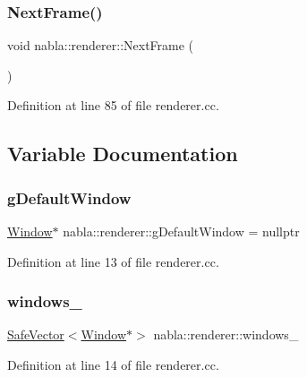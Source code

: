 \subsubsection{\texorpdfstring{NextFrame()}{NextFrame()}}
{\footnotesize\ttfamily void nabla\+::renderer\+::\+Next\+Frame (\begin{DoxyParamCaption}{ }\end{DoxyParamCaption})}



Definition at line 85 of file renderer.\+cc.



\subsection{Variable Documentation}
\mbox{\label{namespacenabla_1_1renderer_ab2fd6f46c4703e0daa3e3fe5a5cef74f}} 
\subsubsection{\texorpdfstring{gDefaultWindow}{gDefaultWindow}}
{\footnotesize\ttfamily \mbox{\hyperlink{classnabla_1_1renderer_1_1_window}{Window}}$\ast$ nabla\+::renderer\+::g\+Default\+Window = nullptr}



Definition at line 13 of file renderer.\+cc.

\mbox{\label{namespacenabla_1_1renderer_ab71ae808482935d60cfc5551412768a0}} 
\subsubsection{\texorpdfstring{windows\_}{windows\_}}
{\footnotesize\ttfamily \mbox{\hyperlink{namespacenabla_a2f96ae838f528e078f7bcdb42fbbe706}{Safe\+Vector}}$<$\mbox{\hyperlink{classnabla_1_1renderer_1_1_window}{Window}}$\ast$$>$ nabla\+::renderer\+::windows\+\_\+}



Definition at line 14 of file renderer.\+cc.

